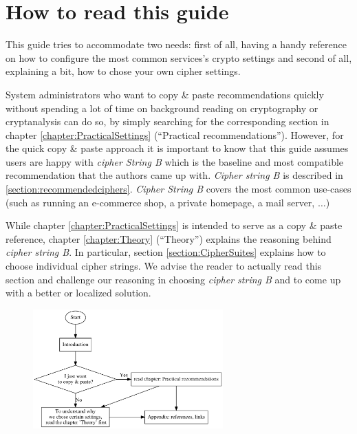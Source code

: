 \section{How to read this guide}

This guide tries to accommodate two needs: first of all, having a handy reference on how to configure the most common services's crypto settings and second of all, explaining a bit, how to chose your own cipher settings.

System administrators who want to copy \& paste recommendations quickly without spending a lot of time on background reading on cryptography or cryptanalysis can do so, by simply searching for the corresponding section in chapter \ref{chapter:PracticalSettings} (``Practical recommendations''). However, for the quick copy \& paste approach it is important to know that this guide assumes users are happy with \textit{cipher String B} which is the baseline and most compatible recommendation that the authors came up with. \textit{Cipher string B} is described in \ref{section:recommendedciphers}. \textit{Cipher String B} covers the most common use-cases (such as running an e-commerce shop, a private homepage, a mail server, $ \ldots $)

While chapter \ref{chapter:PracticalSettings} is intended to serve as a copy \& paste reference, chapter \ref{chapter:Theory} (``Theory'') explains the reasoning behind \textit{cipher string B}. In particular, section \ref{section:CipherSuites} explains how to choose individual cipher strings. We advise the reader to actually read this section and challenge our reasoning in choosing \textit{cipher string B} and to come up with a better  or localized solution.


\begin{figure}[h]
  \centering
  \includegraphics[width=0.65\textwidth]{img/howtoread}
  \label{fig:howtoread}
\end{figure}


